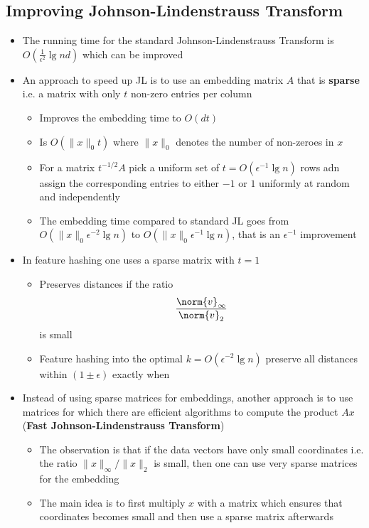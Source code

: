 \subsection{Improving Johnson-Lindenstrauss Transform}
\begin{itemize}
  \item The running time for the standard Johnson-Lindenstrauss Transform is $O(\frac{1}{\epsilon ^2}\lg{n}d)$ which can be improved 
	\item An approach to speed up JL is to use an embedding matrix $A$ that is \textbf{sparse} i.e. a matrix with only $t$ non-zero entries per column
  \begin{itemize}
    \item Improves the embedding time to $O(dt)$
    \item Is $O(\|x\|_0 t)$ where $\| x \|_0$ denotes the number of non-zeroes in $x$
    \item For a matrix $t^{-1/2}A$ pick a uniform set of $t = O(\epsilon^{-1} \lg n)$ rows adn assign the corresponding entries to either $-1$ or $1$ uniformly at random and independently
    \item The embedding time compared to standard JL goes from $O(\| x \|_0 \epsilon^{-2} \lg n)$ to $O(\| x \|_0 \epsilon^{-1} \lg n)$, that is an $\epsilon^{-1}$ improvement
  \end{itemize}
  \item In feature hashing one uses a sparse matrix with $t=1$
  \begin{itemize}
  	\item Preserves distances if the ratio 
    \[
      \frac{\norm{v}_\infty}{\norm{v}_2}
    \]
    is small
    \item Feature hashing into the optimal $k = O(\epsilon^{-2} \lg n)$ preserve all distances within $(1 \pm \epsilon)$ exactly when
  \end{itemize}
  \item Instead of using sparse matrices for embeddings, another approach is to use matrices for which there are efficient algorithms to compute the product $Ax$ (\textbf{Fast Johnson-Lindenstrauss Transform})
  \begin{itemize}
    \item The observation is that if the data vectors have only small coordinates i.e. the ratio $\| x \|_{\infty} / \| x \|_2$ is small, then one can use very sparse matrices for the embedding
  	\item The main idea is to first multiply $x$ with a matrix which ensures that coordinates becomes small and then use a sparse matrix afterwards
  \end{itemize}
\end{itemize}

\newpage
